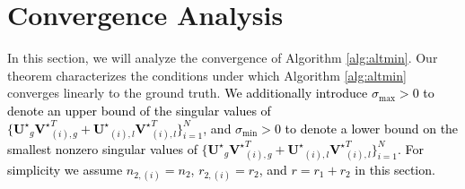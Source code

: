 \documentclass[twoside,11pt]{article}
\newcommand{\revise}[1]{\textcolor{black}{ #1}}
\newcommand{\matUst}{{\mathbf{U}^\star}}
\newcommand{\matVst}{{\mathbf{V}^\star}}
\newcommand{\gop}{\sigma_{\max}}
\newcommand{\sm}{\sigma_{\min}}
\begin{document}
\section{Convergence Analysis}
\label{sec:convergence}
In this section, we will analyze the convergence of Algorithm \ref{alg:altmin}. Our theorem characterizes the conditions under which Algorithm \ref{alg:altmin} converges linearly to the ground truth. \revise{We additionally introduce $\gop >0$ to denote an upper bound of the singular values of $\{\matUst_g\matVst_{(i),g}^T+\matUst_{(i),l}\matVst_{(i),l}^T\}_{i=1}^N$, and $\sm >0$ to denote a lower bound on the smallest nonzero singular values of $\{\matUst_g\matVst_{(i),g}^T+\matUst_{(i),l}\matVst_{(i),l}^T\}_{i=1}^N$. For simplicity we assume $n_{2,(i)}=n_2$, $r_{2,(i)}=r_2$, and $r=r_1+r_2$ in this section.}
\end{document}
